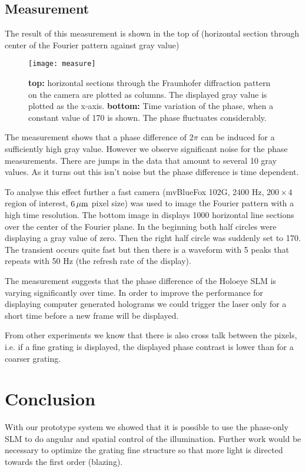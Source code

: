 \subsection{Measurement}
The result of this measurement is shown in the top of
(horizontal section through center of
the Fourier pattern against gray value)
\begin{figure}[!hbt]
  \centering
  \texttt{[image: measure]}
  \caption{{\bf top:} horizontal sections through the Fraunhofer
    diffraction pattern on the camera are plotted as columns. The
    displayed gray value is plotted as the x-axis. {\bf bottom:} Time
    variation of the phase, when a constant value of 170 is shown. The
    phase fluctuates considerably.}
  \label{fig:holo-transfer}
\end{figure}
The measurement shows that a phase difference of $2\pi$ can be induced
for a sufficiently high gray value. However we observe significant
noise for the phase measurements.  There are jumps in the data that
amount to several 10 gray values. As it turns out this isn't noise but
the phase difference is time dependent.

To analyse this effect further a fast camera (mvBlueFox 102G, 2400 Hz,
$200\times4$ region of interest, $\unit[ 6]{\mu m}$ pixel size) was
used to image the Fourier pattern with a high time resolution.  The
bottom image in  displays 1000 horizontal
line sections over the center of the Fourier plane. In the beginning
both half circles were displaying a gray value of zero. Then the right
half circle was suddenly set to 170. The transient occurs quite fast
but then there is a waveform with 5 peaks that repeats with 50 Hz (the
refresh rate of the display).

The measurement suggests that the phase difference of the Holoeye SLM
is varying significantly over time. In order to improve the
performance for displaying computer generated holograms we could
trigger the laser only for a short time before a new frame will be
displayed.

From other experiments we know that there is also cross talk between
the pixels, i.e. if a fine grating is displayed, the displayed phase
contrast is lower than for a coarser grating.
\section{Conclusion}
With our prototype system we showed that it is possible to use the
phase-only SLM to do angular and spatial control of the
illumination. Further work would be necessary to optimize the grating
fine structure so that more light is directed towards the first order
(blazing).

